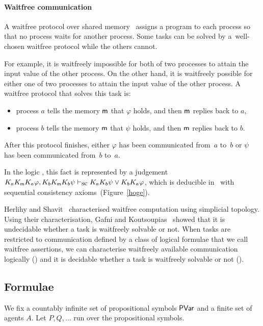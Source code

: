     \paragraph{Waitfree communication}
    A waitfree protocol over shared memory~\cite{herlihy1991wait}
    assigns a program to each process so that no process waits for another process.
    Some tasks can be solved by a~well-chosen waitfree protocol while the others cannot.

    For example,
    it is waitfreely impossible for both of two processes to attain the input value of the other
    process.
    On the other hand, it is waitfreely possible for
    either one of two processes to attain the input value of the other process.
    A waitfree protocol that solves this task is:
    \begin{itemize}
     \item process $a$ tells the memory ${\sf m}$ that $\varphi$ holds, and then ${\sf m}$ replies back to $a$,
     \item process $b$ tells the memory ${\sf m}$ that $\psi$    holds, and then ${\sf m}$ replies back to $b$.
    \end{itemize}
    After this protocol finishes,
    either $\varphi$ has been communicated from~$a$ to~$b$
    or $\psi$ has
    been communicated from~$b$ to~$a$.

    In the
    logic \iec, this fact is represented by a judgement $K_aK_{\sf m}{}K_a\varphi,
    K_bK_{\sf m}{}K_b\psi\vdash_{\mbox{\rm sc}} K_aK_b\psi\vee K_bK_a\varphi$,
    which is deducible in \iec\, with
    sequential consistency axioms~(Figure~\ref{hoge}).

    Herlihy and Shavit~\cite{herlihy1999topological} characterised waitfree computation using
    simplicial topology.
    Using their characterisation,
    Gafni and Koutsoupias~\cite{gafni1999three}
    showed that it is undecidable whether a task is waitfreely solvable
    or not.
    When tasks are restricted to communication defined by
    a class of logical formulae that we call waitfree assertions,
    we can characterise waitfreely available communication logically ()
    and
    it is decidable whether a task is waitfreely solvable or not ().

  \subsection{Formulae}

  We fix a countably infinite set of propositional symbols
  $\mathsf{PVar}$ and a finite set of agents $A$.
  Let $P, Q, \ldots$ run over the propositional symbols.

